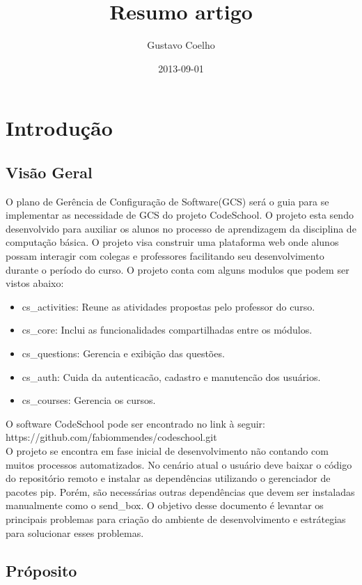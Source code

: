 \documentclass{article}
\title{Resumo artigo}
\date{2013-09-01}
\author{Gustavo Coelho}
\begin{document}


\tableofcontents{}
\newpage

\section{Introdução}
\subsection{Visão Geral}
 O plano de Gerência de Configuração de Software(GCS) será o guia para se implementar as necessidade de GCS do projeto CodeSchool. O projeto esta sendo desenvolvido para auxiliar os alunos no processo de aprendizagem da disciplina de computação básica. O projeto visa construir uma plataforma web onde alunos possam interagir com colegas e professores facilitando seu desenvolvimento durante o período do curso. O projeto conta com alguns modulos que podem ser vistos abaixo: 

\begin{itemize}
    \item[] cs\_activities: Reune as atividades propostas pelo professor do curso.
    \item[] cs\_core: Inclui as funcionalidades compartilhadas entre os módulos. 
    \item[] cs\_questions: Gerencia e exibição das questões. 
    \item[] cs\_auth: Cuida da autenticacão, cadastro e manutencão dos usuários. 
    \item[] cs\_courses: Gerencia os cursos. 
\end{itemize}

O software CodeSchool pode ser encontrado no link à seguir:\\

https://github.com/fabiommendes/codeschool.git \\

O projeto se encontra em fase inicial de desenvolvimento não contando com muitos processos automatizados. No cenário atual o usuário deve baixar o código do repositório remoto e instalar as dependências utilizando o gerenciador de pacotes pip. Porém, são necessárias outras dependências que devem ser instaladas manualmente como o send\_box. O objetivo desse documento é levantar os principais problemas para criação do ambiente de desenvolvimento e estrátegias para solucionar esses problemas.

\subsection{Próposito}
\end{document}
